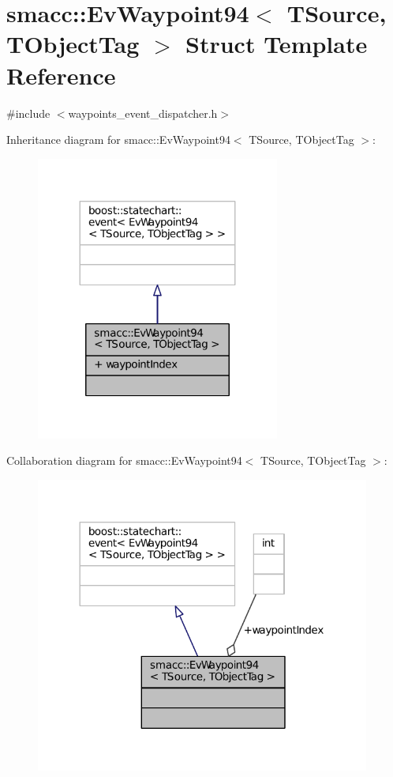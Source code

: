\hypertarget{structsmacc_1_1EvWaypoint94}{}\section{smacc\+:\+:Ev\+Waypoint94$<$ T\+Source, T\+Object\+Tag $>$ Struct Template Reference}
\label{structsmacc_1_1EvWaypoint94}


{\ttfamily \#include $<$waypoints\+\_\+event\+\_\+dispatcher.\+h$>$}



Inheritance diagram for smacc\+:\+:Ev\+Waypoint94$<$ T\+Source, T\+Object\+Tag $>$\+:
\nopagebreak
\begin{figure}[H]
\begin{center}
\leavevmode
\includegraphics[width=227pt]{structsmacc_1_1EvWaypoint94__inherit__graph}
\end{center}
\end{figure}


Collaboration diagram for smacc\+:\+:Ev\+Waypoint94$<$ T\+Source, T\+Object\+Tag $>$\+:
\nopagebreak
\begin{figure}[H]
\begin{center}
\leavevmode
\includegraphics[width=312pt]{structsmacc_1_1EvWaypoint94__coll__graph}
\end{center}
\end{figure}
